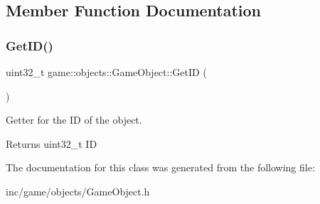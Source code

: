 \subsection{Member Function Documentation}
\mbox{\label{classgame_1_1objects_1_1GameObject_a1fb35a5a82dee7aefe112b81bda8b2c4}} 
\subsubsection{\texorpdfstring{Get\+I\+D()}{GetID()}}
{\footnotesize\ttfamily uint32\+\_\+t game\+::objects\+::\+Game\+Object\+::\+Get\+ID (\begin{DoxyParamCaption}{ }\end{DoxyParamCaption})\hspace{0.3cm}{\ttfamily [inline]}}



Getter for the ID of the object. 

\begin{DoxyReturn}{Returns}
uint32\+\_\+t ID 
\end{DoxyReturn}


The documentation for this class was generated from the following file\+:\begin{DoxyCompactItemize}
\item 
inc/game/objects/Game\+Object.\+h\end{DoxyCompactItemize}
